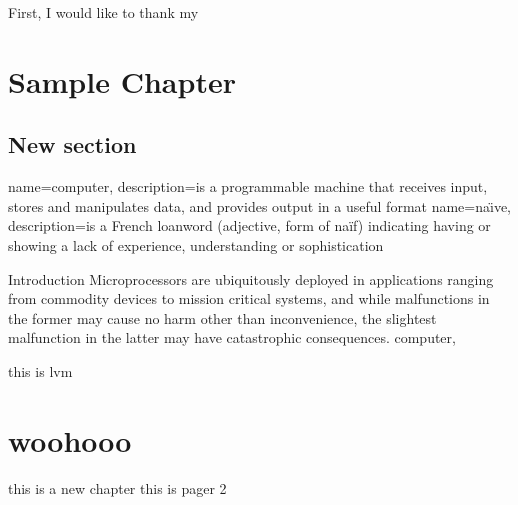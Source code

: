 \documentclass[12pt]{rockefeller}
\begin{document}
First, I would like to thank my 

\tableofcontents

\listoffigures

\listoftables



    


\mainmatter
\pagestyle{fancy}
\fancyhf{}
\lhead{\chaptername\ \thechapter}
\rhead{\thesection}
\rfoot{\thepage}

\chapter{Sample Chapter}
\section{New section}
{
  name=computer,
  description={is a programmable machine that receives input,
               stores and manipulates data, and provides
               output in a useful format}
}
{
  name=na\"{\i}ve,
  description={is a French loanword (adjective, form of naïf)
               indicating having or showing a lack of experience,
               understanding or sophistication}
}

Introduction
Microprocessors are ubiquitously deployed in applications ranging from commodity devices to mission critical systems, and while malfunctions in the former may cause no \newpage harm other than inconvenience, the slightest malfunction in the latter may have catastrophic consequences. \gls{computer}, 

this is \acrshort{lvm}
\newpage

\cite{Arimbasseri:2016ey}
\chapter{woohooo}
this is a new chapter\newpage
this is pager 2
\printglossary[title=List of Terms,toctitle=Terms and abbreviations]

\newpage
\renewcommand{\bibname}{References}



\end{document}

